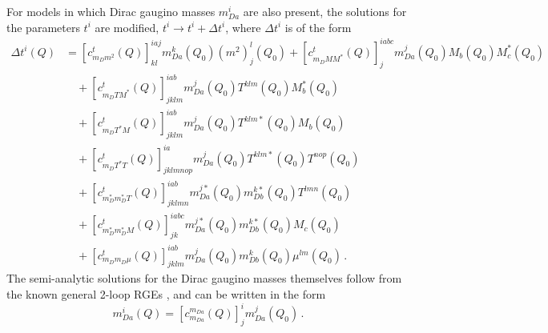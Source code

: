 \documentclass[final,3p,11pt,pdflatex]{elsarticle}
\newcommand{\scoeff}[2]{[ c^{#1}_{#2}(Q) ]}
\begin{document}
For models in which Dirac gaugino masses $m_{Da}^i$ are also present, the
solutions for the parameters $t^i$ are modified, $t^i \to t^i + \Delta t^i$,
where $\Delta t^i$ is of the form
\begin{align}
  \Delta t^i(Q) &= \scoeff{t}{m_D m^2}^{iaj}_{kl} m_{Da}^k(Q_0) (m^2)_j^l(Q_0)
  + \scoeff{t}{m_D M M^*}^{iabc}_j m_{Da}^j(Q_0) M_b(Q_0) M_c^*(Q_0)
  \nonumber \\
  & \quad {} + \scoeff{t}{m_D T M^*}^{iab}_{jklm} m_{Da}^j(Q_0) T^{klm}(Q_0)
  M_b^*(Q_0) \nonumber \\
  & \quad {} + \scoeff{t}{m_D T^* M}^{iab}_{jklm} m_{Da}^j(Q_0) T^{klm*}(Q_0)
  M_b(Q_0) \nonumber \\
  & \quad {} + \scoeff{t}{m_D T^* T}^{ia}_{jklmnop} m_{Da}^j(Q_0) T^{klm*}(Q_0)
  T^{nop}(Q_0) \nonumber \\
  & \quad {} + \scoeff{t}{m_D^* m_D^* T}^{iab}_{jklmn} m_{Da}^{j*}(Q_0)
  m_{Db}^{k*}(Q_0) T^{lmn}(Q_0) \nonumber \\
  & \quad {} + \scoeff{t}{m_D^* m_D^* M}^{iabc}_{jk} m_{Da}^{j*}(Q_0)
  m_{Db}^{k*}(Q_0) M_c(Q_0) \nonumber \\
  & \quad {} + \scoeff{t}{m_D m_D \mu}^{iab}_{jklm} m_{Da}^j(Q_0) m_{Db}^k(Q_0)
  \mu^{lm}(Q_0) \, . \label{eq:extra-soft-trilinear-solution}
\end{align}
The semi-analytic solutions for the Dirac gaugino masses themselves follow
from the known general 2-loop RGEs \cite{Goodsell:2012fm}, and can be
written in the form
\begin{equation} \label{eq:general-dirac-gaugino-solutions}
  m_{Da}^i(Q) = \scoeff{m_{Da}}{m_{Da}}^i_j m^j_{Da}(Q_0) \, .
\end{equation}
\end{document}
